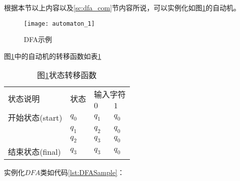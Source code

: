 根据本节以上内容以及\ref{sc:dfa_com}节内容所说，可以实例化如图\ref{fig:DFA1}的自动机。

\begin{figure}[!htbp]
    \centering
    \texttt{[image: automaton\_1]}
    \caption{DFA示例}
    \label{fig:DFA1}
\end{figure}

图\ref{fig:DFA1}中的自动机的转移函数如表\ref{tab:DFA1}

\begin{table}[!htbp]
    \caption{图{\ref{fig:DFA1}}状态转移函数}
    \label{tab:DFA1}
    \centering
    \small%
    \setlength{\tabcolsep}{4pt}%
    \renewcommand{\arraystretch}{1.2}%
    \begin{tabular}{l p{3em}<{\centering} p{3em}<{\centering} p{3em}<{\centering}}
        \toprule %
        \multirow{2}{*}{状态说明} & \multirow{2}{*}{状态} & \multicolumn{2}{c}{输入字符} \\
		\cline{3-4}      &    &$0$ & $1$  \\
        \midrule%
        开始状态(start)          & $q_0$ & $q_1$  & $q_0$    \\
                                & $q_1$ & $q_2$  & $q_0$    \\
                                & $q_2$ & $q_3$  & $q_0$    \\
        结束状态(final)         & $q_3$ & $q_3$  & $q_0$    \\
        \bottomrule%
    \end{tabular}
\end{table}

实例化$DFA$类如代码\ref{lst:DFASample}：






